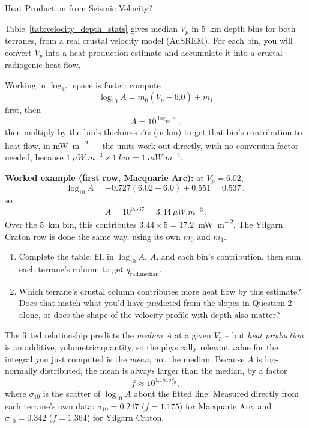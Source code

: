 \begin{activity}{Heat Production from Seismic Velocity?}
\begin{questions}
  Table~\ref{tab:velocity_depth_stats} gives median $V_p$ in 5~km depth bins for both terranes, from a real crustal velocity model (AuSREM). For each bin, you will convert $V_p$ into a heat production estimate and accumulate it into a crustal radiogenic heat flow.

  Working in $\log_{10}$ space is faster: compute
  \[
    \log_{10}A = m_0(V_p-6.0)+m_1
  \]
  first, then 
  \[
    A=10^{\log_{10}A}\, ,
  \]
  then multiply by the bin's thickness $\Delta z$ (in \si{km}) to get that bin's contribution to heat flow, in \si{mW.m^{-2}} --- the units work out directly, with no conversion factor needed, because $\SI{1}{\mu W.m^{-3}} \times \SI{1}{km} = \SI{1}{mW.m^{-2}}$.

  \textbf{Worked example (first row, Macquarie Arc):} at $V_p=6.02$,
  \[
    \log_{10}A = -0.727(6.02-6.0)+0.551 = 0.537\, ,
  \]
  so
  \[ 
    A=10^{0.537}= \SI{3.44}{\mu W.m^{-3}}\, .
  \]
  Over the \SI{5}{km} bin, this contributes $3.44\times5=17.2$~\si{mW.m^{-2}}. The Yilgarn Craton row is done the same way, using its own $m_0$ and $m_1$.
  

  \begin{enumerate}[label=(\alph*)]
    \item Complete the table: fill in $\log_{10}A$, $A$, and each bin's contribution, then sum each terrane's column to get $q_\text{rad,median}$.
    \answerbox[1cm]
    \FloatBarrier

    \item Which terrane's crustal column contributes more heat flow by this estimate? Does that match what you'd have predicted from the slopes in Question 2 alone, or does the shape of the velocity profile with depth also matter?
    \answerbox[2.5cm]
  \end{enumerate}


  The fitted relationship predicts the \emph{median} $A$ at a given $V_p$ -- but \emph{heat production} is an additive, volumetric quantity, so the physically relevant value for the integral you just computed is the \emph{mean}, not the median. Because $A$ is log-normally distributed, the mean is always larger than the median, by a factor
  \[
    f \approx 10^{1.151 \sigma_{10}^2},
  \]
  where $\sigma_{10}$ is the scatter of $\log_{10}A$ about the fitted line. Measured directly from each terrane's own data: $\sigma_{10}=0.247$ ($f=1.175$) for Macquarie Arc, and $\sigma_{10}=0.342$ ($f=1.364$) for Yilgarn Craton.


\end{questions}
\end{activity}
